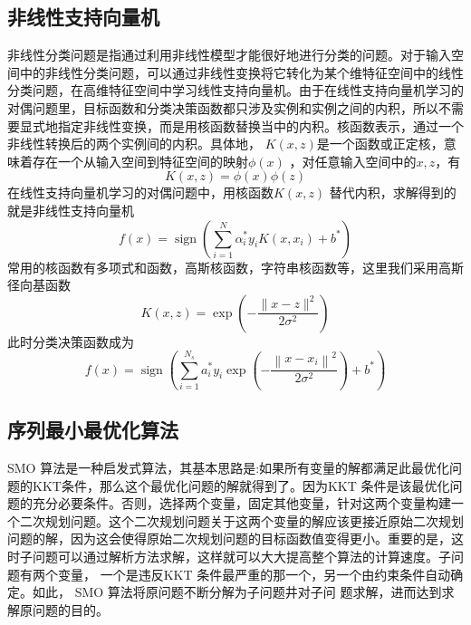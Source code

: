 \documentclass{progartcn}
\begin{document}
\subsection{非线性支持向量机}
非线性分类问题是指通过利用非线性模型才能很好地进行分类的问题。对于输入空间中的非线性分类问题，可以通过非线性变换将它转化为某个维特征空间中的线性分类问题，在高维特征空间中学习线性支持向量机。由于在线性支持向量机学习的对偶问题里，目标函数和分类决策函数都只涉及实例和实例之间的内积，所以不需要显式地指定非线性变换，而是用核函数替换当中的内积。核函数表示，通过一个非线性转换后的两个实例间的内积。具体地， $K(x,z)$是一个函数或正定核，意味着存在一个从输入空间到特征空间的映射$\phi(x)$ ，对任意输入空间中的$x,z$，有
\begin{equation}
	K(x,z) = \phi(x)\phi(z)
\end{equation}
在线性支持向量机学习的对偶问题中，用核函数$K(x,z)$ 替代内积，求解得到的就是非线性支持向量机
\begin{equation}
	f(x)=\operatorname{sign}\left(\sum_{i=1}^{N} \alpha_{i}^{*} y_{i} K\left(x, x_{i}\right)+b^{*}\right)
\end{equation}
常用的核函数有多项式和函数，高斯核函数，字符串核函数等，这里我们采用高斯径向基函数
\begin{equation}
	K(x, z)=\exp \left(-\frac{\|x-z\|^{2}}{2 \sigma^{2}}\right)
\end{equation}
此时分类决策函数成为
\begin{equation}
	f(x)=\operatorname{sign}\left(\sum_{i=1}^{N_{s}} a_{i}^{*} y_{i} \exp \left(-\frac{\left\|x-x_{i}\right\|^{2}}{2 \sigma^{2}}\right)+b^{*}\right)
\end{equation}
\subsection{序列最小最优化算法}
SMO 算法是一种启发式算法，其基本思路是:如果所有变量的解都满足此最优化问题的KKT条件，那么这个最优化问题的解就得到了。因为KKT 条件是该最优化问题的充分必要条件。否则，选择两个变量，固定其他变量，针对这两个变量构建一个二次规划问题。这个二次规划问题关于这两个变量的解应该更接近原始二次规划问题的解，因为这会使得原始二次规划问题的目标函数值变得更小。重要的是，这时子问题可以通过解析方法求解，这样就可以大大提高整个算法的计算速度。子问题有两个变量， 一个是违反KKT 条件最严重的那一个，另一个由约束条件自动确定。如此， SMO 算法将原问题不断分解为子问题井对子问
题求解，进而达到求解原问题的目的。
\end{document}

